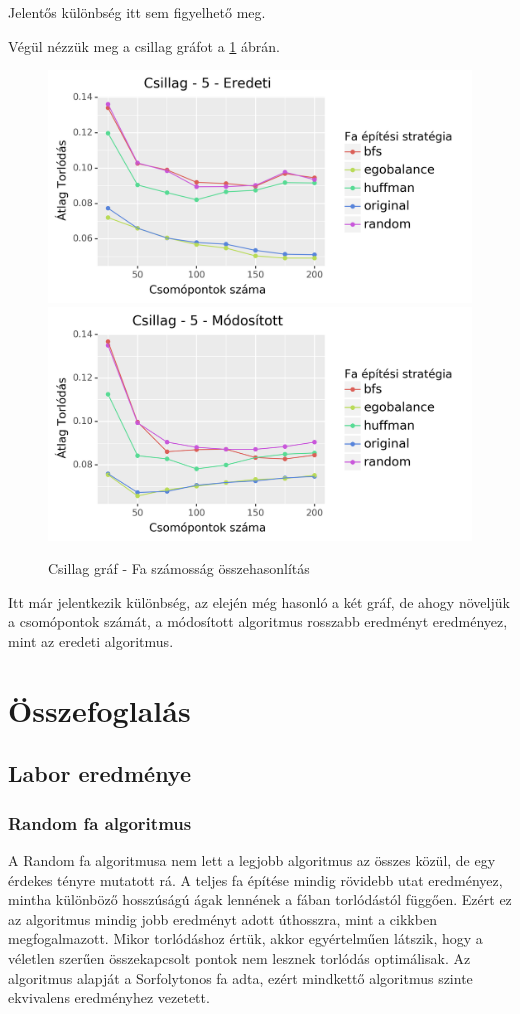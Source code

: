 \documentclass[12pt]{report}
\begin{document}
Jelentős különbség itt sem figyelhető meg.

Végül nézzük meg a csillag gráfot a \ref{star-tree-difference-con} ábrán. 

\begin{figure}[H]
	\begin{center}
		\includegraphics[width=0.49\linewidth]{pictures/star_con_e.png}
		\includegraphics[width=0.49\linewidth]{pictures/star_con_m.png}
		\caption{Csillag gráf - Fa számosság összehasonlítás}
		\label{star-tree-difference-con}
	\end{center}
\end{figure}

Itt már jelentkezik különbség, az elején még hasonló a két gráf, de ahogy növeljük a csomópontok számát, a módosított algoritmus rosszabb eredményt eredményez, mint az eredeti algoritmus.

\chapter{Összefoglalás}

\section{Labor eredménye}

\subsection{Random fa algoritmus}

A Random fa algoritmusa nem lett a legjobb algoritmus az összes közül, de egy érdekes tényre mutatott rá.
A teljes fa építése mindig rövidebb utat eredményez, mintha különböző hosszúságú ágak lennének a fában torlódástól függően.
Ezért ez az algoritmus mindig jobb eredményt adott úthosszra, mint a cikkben megfogalmazott.
Mikor torlódáshoz értük, akkor egyértelműen látszik, hogy a véletlen szerűen összekapcsolt pontok nem lesznek torlódás optimálisak.
Az algoritmus alapját a Sorfolytonos fa adta, ezért mindkettő algoritmus szinte ekvivalens eredményhez vezetett.
 
\end{document}
